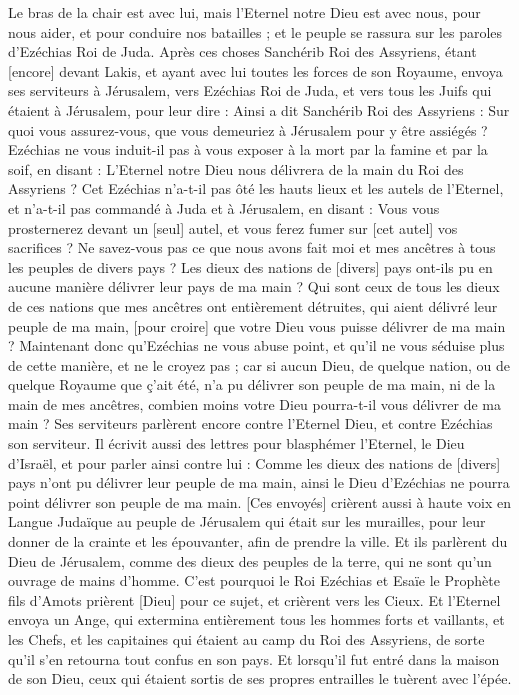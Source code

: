 \begin{multicols}{2}
Le bras de la chair est avec lui, mais l'Eternel notre Dieu est avec nous, pour nous aider, et pour conduire nos batailles ; et le peuple se rassura sur les paroles d'Ezéchias Roi de Juda.
Après ces choses Sanchérib Roi des Assyriens, étant [encore] devant Lakis, et ayant avec lui toutes les forces de son Royaume, envoya ses serviteurs à Jérusalem, vers Ezéchias Roi de Juda, et vers tous les Juifs qui étaient à Jérusalem, pour leur dire :
Ainsi a dit Sanchérib Roi des Assyriens : Sur quoi vous assurez-vous, que vous demeuriez à Jérusalem pour y être assiégés ?
Ezéchias ne vous induit-il pas à vous exposer à la mort par la famine et par la soif, en disant : L'Eternel notre Dieu nous délivrera de la main du Roi des Assyriens ?
Cet Ezéchias n'a-t-il pas ôté les hauts lieux et les autels de l'Eternel, et n'a-t-il pas commandé à Juda et à Jérusalem, en disant : Vous vous prosternerez devant un [seul] autel, et vous ferez fumer sur [cet autel] vos sacrifices ?
Ne savez-vous pas ce que nous avons fait moi et mes ancêtres à tous les peuples de divers pays ? Les dieux des nations de [divers] pays ont-ils pu en aucune manière délivrer leur pays de ma main ?
Qui sont ceux de tous les dieux de ces nations que mes ancêtres ont entièrement détruites, qui aient délivré leur peuple de ma main, [pour croire] que votre Dieu vous puisse délivrer de ma main ?
Maintenant donc qu'Ezéchias ne vous abuse point, et qu'il ne vous séduise plus de cette manière, et ne le croyez pas ; car si aucun Dieu, de quelque nation, ou de quelque Royaume que ç'ait été, n'a pu délivrer son peuple de ma main, ni de la main de mes ancêtres, combien moins votre Dieu pourra-t-il vous délivrer de ma main ?
Ses serviteurs parlèrent encore contre l'Eternel Dieu, et contre Ezéchias son serviteur.
Il écrivit aussi des lettres pour blasphémer l'Eternel, le Dieu d'Israël, et pour parler ainsi contre lui : Comme les dieux des nations de [divers] pays n'ont pu délivrer leur peuple de ma main, ainsi le Dieu d'Ezéchias ne pourra point délivrer son peuple de ma main.
[Ces envoyés] crièrent aussi à haute voix en Langue Judaïque au peuple de Jérusalem qui était sur les murailles, pour leur donner de la crainte et les épouvanter, afin de prendre la ville.
Et ils parlèrent du Dieu de Jérusalem, comme des dieux des peuples de la terre, qui ne sont qu'un ouvrage de mains d'homme.
C'est pourquoi le Roi Ezéchias et Esaïe le Prophète fils d'Amots prièrent [Dieu] pour ce sujet, et crièrent vers les Cieux.
Et l'Eternel envoya un Ange, qui extermina entièrement tous les hommes forts et vaillants, et les Chefs, et les capitaines qui étaient au camp du Roi des Assyriens, de sorte qu'il s'en retourna tout confus en son pays. Et lorsqu'il fut entré dans la maison de son Dieu, ceux qui étaient sortis de ses propres entrailles le tuèrent avec l'épée.

\end{multicols}
